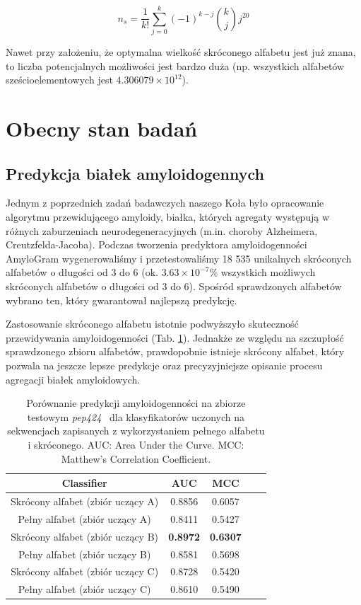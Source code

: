 \documentclass{article}
\begin{document}
$$ n_s = \frac{1}{k!} \sum^{k}_{j = 0} (-1)^{k-j}  {k \choose j} j^{20} $$

Nawet przy założeniu, że optymalna wielkość skróconego alfabetu jest już znana, 
to liczba potencjalnych możliwości jest bardzo duża (np. wszystkich alfabetów 
sześcioelementowych jest $4.306079 \times 10^{12}$).

\section{Obecny stan badań}

\subsection{Predykcja białek amyloidogennych}

Jednym z poprzednich zadań badawczych naszego Koła było opracowanie algorytmu 
przewidującego amyloidy, białka, których agregaty występują w różnych 
zaburzeniach neurodegeneracyjnych (m.in. choroby Alzheimera, 
Creutzfelda-Jacoba). Podczas tworzenia predyktora amyloidogenności AmyloGram 
wygenerowaliśmy i przetestowaliśmy 18 535 unikalnych skróconych alfabetów o 
długości od 3 do 6 (ok. $3.63 \times 10^{-7} \% $ wszystkich możliwych 
skróconych alfabetów o długości od 3 do 6). Spośród sprawdzonych alfabetów 
wybrano ten, który gwarantował najlepszą predykcję. 

Zastosowanie skróconego alfabetu istotnie podwyższyło skuteczność przewidywania 
amyloidogenności (Tab. \ref{tab:alfabety}). Jednakże ze względu na szczupłość 
sprawdzonego zbioru alfabetów, prawdopobnie istnieje skrócony alfabet, który 
pozwala na jeszcze lepsze predykcje oraz precyzyjniejsze opisanie procesu 
agregacji białek amyloidowych.

\begin{table}[ht]
\centering
\small
\caption{Porównanie predykcji amyloidogenności na zbiorze testowym 
\textit{pep424}~\citep{walsh_pasta_2014} dla klasyfikatorów uczonych na 
sekwencjach zapisanych z wykorzystaniem pełnego alfabetu i skróconego. AUC: Area 
Under the Curve. MCC: Matthew's Correlation Coefficient.} 
\label{tab:alfabety}
\begin{tabular}{ccccc}
  \toprule
Classifier & AUC & MCC  \\ 
  \midrule
Skrócony alfabet (zbiór uczący A) & 0.8856 & 0.6057  \\
   \rowcolor[gray]{0.85}Pełny alfabet (zbiór uczący A) & 0.8411 & 0.5427 \\ 

Skrócony alfabet (zbiór uczący B) & \textbf{0.8972} & \textbf{0.6307}  \\ 
  \rowcolor[gray]{0.85}Pełny alfabet (zbiór uczący B) & 0.8581 & 0.5698 
\\ 
Skrócony alfabet (zbiór uczący C) & 0.8728 & 0.5420 
\\
   \rowcolor[gray]{0.85}Pełny alfabet (zbiór uczący C) & 0.8610 & 0.5490 & \\
   \bottomrule
\end{tabular}
\end{table}
\end{document}
